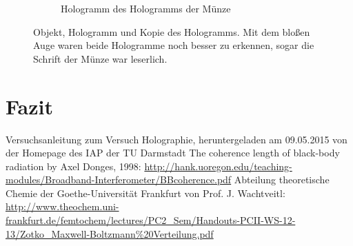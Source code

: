 \documentclass[bigchapter,colorback,accentcolor=tud4b,linedtoc,11pt]{tudreport}
\begin{document}
\begin{figure}[H]
\begin{subfigure}[h]{0.3\textwidth}
    \caption{Hologramm des Hologramms der Münze}
    \label{fig:gedenkholokopie}
  \end{subfigure}
  \caption{Objekt, Hologramm und Kopie des Hologramms. Mit dem bloßen Auge waren
  beide Hologramme noch besser zu erkennen, sogar die Schrift der Münze war leserlich.}\label{fig:genkhologramme}
\end{figure}


\chapter{Fazit}

\cleardoublepage{}
\newpage
\begin{thebibliography}{100}
   Versuchsanleitung zum Versuch Holographie, heruntergeladen am 09.05.2015 von der Homepage des IAP der TU Darmstadt
   The coherence length of black-body
radiation by Axel Donges, 1998: \url{http://hank.uoregon.edu/teaching-modules/Broadband-Interferometer/BBcoherence.pdf}
   Abteilung theoretische Chemie der Goethe-Universität
    Frankfurt von Prof. J. Wachtveitl: \url{http://www.theochem.uni-frankfurt.de/femtochem/lectures/PC2_Sem/Handouts-PCII-WS-12-13/Zotko_Maxwell-Boltzmann%20Verteilung.pdf}
\end{thebibliography}
\end{document}
